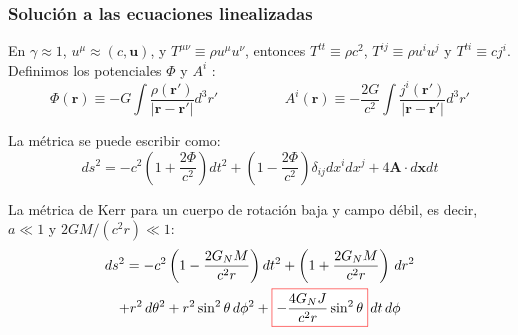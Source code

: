 \documentclass[aspectratio=169,10pt,usenames,dvipsnames,spanish]{beamer}
\newcommand{\ve}[1]{\mathbf{#1}}    %
\begin{document}
\begin{frame}
\frametitle{Solución a las ecuaciones linealizadas}
    En $\gamma\approx1$, $u^\mu\approx(c,\ve{u})$, y $T^{\mu\nu}\equiv\rho u^\mu u^\nu$, entonces $T^{tt}\equiv\rho c^2$, $T^{ij}\equiv\rho u^i u^j$ y $T^{ti}\equiv cj^i$. Definimos los potenciales $\Phi$ y $A^i$ \parencite{SJ2020, Mashhoon1999}:
\begin{equation}\label{potencialesGEM}
    \Phi(\mathbf{r})\equiv -G\int \frac{\rho(\mathbf{r'})}{|\mathbf{r}-\mathbf{r'}|}d^3r' \hspace{2cm} A^i(\mathbf{r})\equiv -\frac{2G}{c^2}\int \frac{j^i(\mathbf{r'})}{|\mathbf{r}-\mathbf{r'}|}d^3r'
\end{equation}

La métrica se puede escribir como:
\begin{equation}\label{ElementoLinea}
    ds^2=-c^2\left(1+\frac{2\Phi}{c^2}\right)dt^2+\left(1-\frac{2\Phi}{c^2}\right)\delta_{ij}dx^idx^j+4\mathbf{A}\cdot d\mathbf{x}dt
\end{equation}

La métrica de Kerr para un cuerpo de rotación baja y campo débil, es decir, $a \ll1$ y $2GM/(c^2r) \ll 1$:
\begin{multline}
ds^2=-c^2\left(1-\frac{2G_NM}{c^2r}\right)dt^2
+\left(1+\frac{2G_NM}{c^2r}\right)\, dr^2 \\ 
+r^2 \,d\theta^2+r^2\sin^2 \theta \,d\phi^2
+\text{\fcolorbox{red}{white}{$-\frac{4G_NJ}{c^2r}\sin^2\theta$}}\, dt\, d\phi
\end{multline}
\end{frame}



\end{document}
